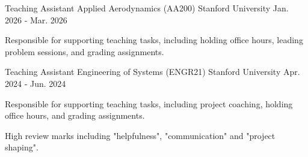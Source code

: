 

\begin{cventries}


  \cventry
    {Teaching Assistant} %
    {Applied Aerodynamics (AA200)} %
    {Stanford University} %
    {Jan. 2026 - Mar. 2026} %
    {
      \begin{cvitems} %
        \item {Responsible for supporting teaching tasks, including holding office hours, leading problem sessions, and grading assignments.}
      \end{cvitems}
    }

  \cventry
    {Teaching Assistant} %
    {Engineering of Systems (ENGR21)} %
    {Stanford University} %
    {Apr. 2024 - Jun. 2024} %
    {
      \begin{cvitems} %
        \item {Responsible for supporting teaching tasks, including project coaching, holding office hours, and grading assignments.}
        \item {High review marks including "helpfulness", "communication" and "project shaping".}
      \end{cvitems}
    }
    

\end{cventries}
